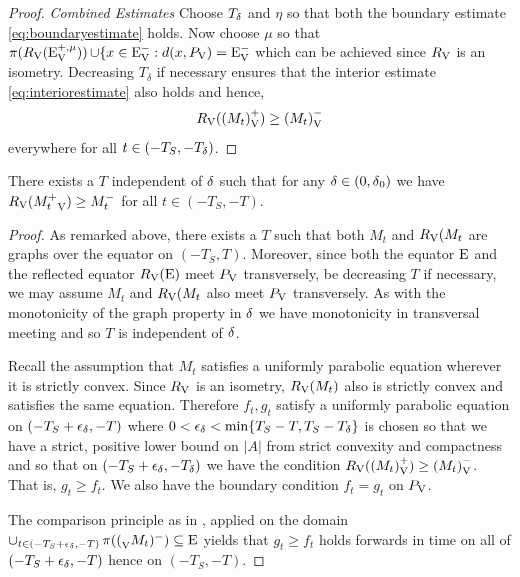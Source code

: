 \documentclass{amsart}
\begin{document}
\begin{proof}
\emph{Combined Estimates}
Choose \(T_{\operatorname{\delta}}\) and \(\eta\) so that both the boundary estimate \cref{eq:boundaryestimate} holds. Now choose \(\mu\) so that \(\operatorname{\pi}(R_{\operatorname{V}}({\operatorname{E}}_{\operatorname{V}}^{+,\mu})) \operatorname{\cup} \{x \in {\operatorname{E}}_{\operatorname{V}}^- : d(x, P_{\operatorname{V}}) = {\operatorname{E}}_{\operatorname{V}}^-\) which can be achieved since \(R_{\operatorname{V}}\) is an isometry. Decreasing \(T_{\delta}\) if necessary ensures that the interior estimate \cref{eq:interiorestimate} also holds and hence,
\[
R_{\operatorname{V}}({(M_t)}_{\operatorname{V}}^+) \geq {(M_t)}_{\operatorname{V}}^-
\]
everywhere for all \(t \in (-T_S, -T_{\operatorname{\delta}})\).
\end{proof}

\begin{lemma}
\label{lem:approximate_symmetrypreserved}
There exists a \(T\) independent of \(\operatorname{\delta}\) such that for any \(\operatorname{\delta} \in (0,\operatorname{\delta}_0)\) we have \(R_{\operatorname{V}}({M_t^+}_{\operatorname{V}}) \geq M_t^-\) for all \(t \in (-T_S, -T)\).
\end{lemma}
\begin{proof}
As remarked above, there exists a \(T\) such that both \(M_t\) and \(R_{\operatorname{V}}(M_t\) are graphs over the equator on \((-T_S, T)\). Moreover, since both the equator \(\operatorname{E}\) and the reflected equator \(R_{\operatorname{V}}(\operatorname{E})\) meet \(P_{\operatorname{V}}\) transversely, be decreasing \(T\) if necessary, we may assume \(M_t\) and \(R_{\operatorname{V}}(M_t\) also meet \(P_{\operatorname{V}}\) transversely. As with the monotonicity of the graph property in \(\operatorname{\delta}\) we have monotonicity in transversal meeting and so \(T\) is independent of \(\operatorname{\delta}\).

Recall the assumption that \(M_t\) satisfies a uniformly parabolic equation wherever it is strictly convex. Since \(R_{\operatorname{V}}\) is an isometry, \(R_{\operatorname{V}}(M_t)\) also is strictly convex and satisfies the same equation. Therefore \(f_t,g_t\) satisfy a uniformly parabolic equation on \((-T_S + \epsilon_{\operatorname{\delta}}, -T)\) where \(0 < \epsilon_{\operatorname{\delta}} < \min\{T_S-T, T_S-T_{\operatorname{\delta}}\}\) is chosen so that we have a strict, positive lower bound on \(|A|\) from strict convexity and compactness and so that on \((-T_S + \epsilon_{\operatorname{\delta}}, -T_{\operatorname{\delta}})\) we have the condition \(R_{\operatorname{V}}({(M_t)}_{\operatorname{V}}^+) \geq {(M_t)}_{\operatorname{V}}^-\). That is, \(g_t \geq f_t\). We also have the boundary condition \(f_t = g_t\) on \(P_{\operatorname{V}}\).

The comparison principle as in \cite[Theorem 3.1.1]{giga}, applied on the domain \(\operatorname{\cup}\limits_{t \in (-T_S + \epsilon_{\operatorname{\delta}}, -T)} \operatorname{\pi}({(}_{\operatorname{V}}M_t)^-) \subseteq \operatorname{E}\) yields that \(g_t \geq f_t\) holds forwards in time on all of \((-T_S + \epsilon_{\operatorname{\delta}}, -T)\) hence on \((-T_S, -T)\). 
\end{proof}
\end{document}
